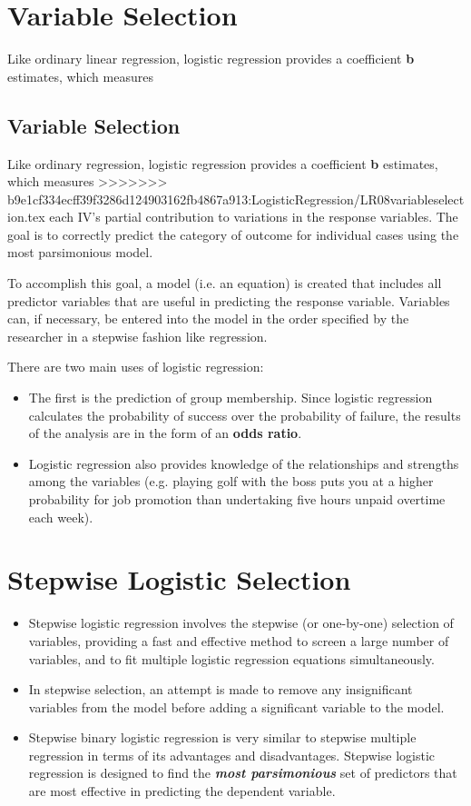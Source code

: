 \documentclass[a4paper,12pt]{article}
\begin{document}
\section*{Variable Selection}
Like ordinary linear regression, logistic regression provides a coefficient \textbf{b} estimates, which measures

	\tableofcontents
\subsection{Variable Selection}
Like ordinary regression, logistic regression provides a coefficient \textbf{b} estimates, which measures
>>>>>>> b9e1cf334ecff39f3286d124903162fb4867a913:LogisticRegression/LR08variableselection.tex
each IV's partial contribution to variations in the response variables. The goal is to correctly predict
the category of outcome for individual cases using the most parsimonious model.

\noindent To accomplish this goal, a model (i.e. an equation) is created that includes all predictor variables that are useful in predicting the response variable. Variables can, if necessary, be entered into the model in the order specified by the researcher in a stepwise fashion like regression.


There are two main uses of logistic regression:
\begin{itemize}
	\item The first is the prediction of group membership. Since logistic regression calculates the
	probability of success over the probability of failure, the results of the analysis are in
	the form of an \textbf{odds ratio}.
	\item Logistic regression also provides knowledge of the relationships and strengths among
	the variables (e.g. playing golf with the boss puts you at a higher probability for job
	promotion than undertaking five hours unpaid overtime each week).
\end{itemize}


\section*{Stepwise Logistic Selection}
\begin{itemize}
\item Stepwise logistic regression involves the stepwise (or one-by-one) selection of variables,
	providing a fast and effective method to screen a large number of variables, and to fit
	multiple logistic regression equations simultaneously.
	
\item In stepwise selection, an attempt is made to remove any insignificant variables from the model before adding a significant variable to the model.
	
\item Stepwise binary logistic regression is very similar to stepwise multiple regression in terms of its advantages and disadvantages. Stepwise logistic regression is designed to find the \textbf{\textit{most parsimonious}} set of predictors that are most effective in predicting the dependent variable.
\end{itemize}
\end{document}
